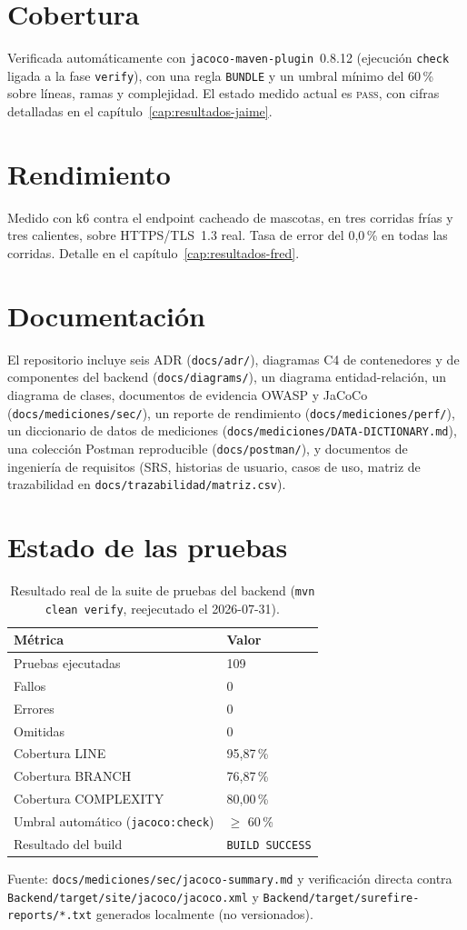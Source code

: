 \section{Cobertura}
Verificada autom\'aticamente con \texttt{jacoco-maven-plugin}~0.8.12
(ejecuci\'on \texttt{check} ligada a la fase \texttt{verify}), con una
regla \texttt{BUNDLE} y un umbral m\'inimo del 60\,\% sobre l\'ineas, ramas
y complejidad. El estado medido actual es \textsc{pass}, con cifras
detalladas en el cap\'itulo~\ref{cap:resultados-jaime}.

\section{Rendimiento}
Medido con k6 contra el endpoint cacheado de mascotas, en tres corridas
fr\'ias y tres calientes, sobre HTTPS/TLS~1.3 real. Tasa de error del
0{,}0\,\% en todas las corridas. Detalle en el
cap\'itulo~\ref{cap:resultados-fred}.

\section{Documentaci\'on}
El repositorio incluye seis ADR (\texttt{docs/adr/}), diagramas C4 de
contenedores y de componentes del backend (\texttt{docs/diagrams/}), un
diagrama entidad-relaci\'on, un diagrama de clases, documentos de evidencia
OWASP y JaCoCo (\texttt{docs/mediciones/sec/}), un reporte de rendimiento
(\texttt{docs/mediciones/perf/}), un diccionario de datos de mediciones
(\texttt{docs/mediciones/DATA-DICTIONARY.md}), una colecci\'on Postman
reproducible (\texttt{docs/postman/}), y documentos de ingenier\'ia de
requisitos (SRS, historias de usuario, casos de uso, matriz de
trazabilidad en \texttt{docs/trazabilidad/matriz.csv}).

\section{Estado de las pruebas}
\begin{table}[H]
  \centering
  \caption{Resultado real de la suite de pruebas del backend (\texttt{mvn clean verify}, reejecutado el 2026-07-31).}
  \label{tab:estado-pruebas}
  \begin{tabular}{@{}ll@{}}
    \toprule
    M\'etrica & Valor \\
    \midrule
    Pruebas ejecutadas & 109 \\
    Fallos & 0 \\
    Errores & 0 \\
    Omitidas & 0 \\
    Cobertura LINE & 95{,}87\,\% \\
    Cobertura BRANCH & 76{,}87\,\% \\
    Cobertura COMPLEXITY & 80{,}00\,\% \\
    Umbral autom\'atico (\texttt{jacoco:check}) & \(\geq\) 60\,\% \\
    Resultado del build & \texttt{BUILD SUCCESS} \\
    \bottomrule
  \end{tabular}
\end{table}

Fuente: \texttt{docs/mediciones/sec/jacoco-summary.md} y verificaci\'on
directa contra \texttt{Backend/target/site/jacoco/jacoco.xml} y
\texttt{Backend/target/surefire-reports/*.txt} generados localmente (no
versionados).
